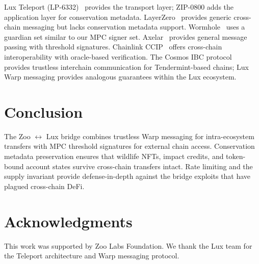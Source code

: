 \documentclass[11pt,letterpaper]{article}
\begin{document}
Lux Teleport (LP-6332)~\cite{teleport2022} provides the transport layer; ZIP-0800 adds the application layer for conservation metadata. LayerZero~\cite{layerzero2022} provides generic cross-chain messaging but lacks conservation metadata support. Wormhole~\cite{wormhole2022} uses a guardian set similar to our MPC signer set. Axelar~\cite{axelar2022} provides general message passing with threshold signatures. Chainlink CCIP~\cite{ccip2023} offers cross-chain interoperability with oracle-based verification. The Cosmos IBC protocol~\cite{ibc2019} provides trustless interchain communication for Tendermint-based chains; Lux Warp messaging provides analogous guarantees within the Lux ecosystem.

\section{Conclusion}

The Zoo $\leftrightarrow$ Lux bridge combines trustless Warp messaging for intra-ecosystem transfers with MPC threshold signatures for external chain access. Conservation metadata preservation ensures that wildlife NFTs, impact credits, and token-bound account states survive cross-chain transfers intact. Rate limiting and the supply invariant provide defense-in-depth against the bridge exploits that have plagued cross-chain DeFi.

\section*{Acknowledgments}

This work was supported by Zoo Labs Foundation. We thank the Lux team for the Teleport architecture and Warp messaging protocol.
\end{document}
